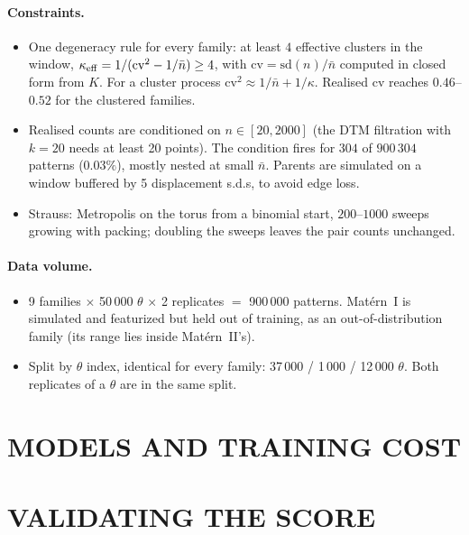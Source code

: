 \documentclass[twoside]{article}
\newcommand{\nb}{\bar n}
\begin{document}
\paragraph{Constraints.}
\begin{itemize}
  \item One degeneracy rule for every family: at least $4$ effective clusters in the window,
        $\kappa_{\rm eff}=1/(\mathrm{cv}^2-1/\nb)\ge4$, with $\mathrm{cv}=\mathrm{sd}(n)/\nb$ computed in closed form
        from $K$. For a cluster process $\mathrm{cv}^2\approx1/\nb+1/\kappa$.
        Realised cv reaches $0.46$--$0.52$ for the clustered families.
  \item Realised counts are conditioned on $n\in[20,2000]$ (the DTM filtration with $k=20$ needs at least 20 points). The condition fires
        for $304$ of $900\,304$ patterns ($0.03\%$), mostly nested at small $\nb$. Parents are simulated on a window
        buffered by 5 displacement s.d.s, to avoid edge loss.
  \item Strauss: Metropolis on the torus from a binomial start, $200$--$1000$ sweeps growing with packing;
        doubling the sweeps leaves the pair counts unchanged.
\end{itemize}

\paragraph{Data volume.}
\begin{itemize}
  \item 9 families $\times$ 50\,000 $\theta$ $\times$ 2 replicates $=$ 900\,000 patterns. Mat\'ern~I is simulated
        and featurized but held out of training, as an out-of-distribution family (its range lies inside
        Mat\'ern~II's).
  \item Split by $\theta$ index, identical for every family: 37\,000 / 1\,000 / 12\,000 $\theta$. Both replicates of
        a $\theta$ are in the same split.
\end{itemize}


\section{MODELS AND TRAINING COST}
\label{app:models}


\section{VALIDATING THE SCORE}
\label{app:score}
\end{document}
